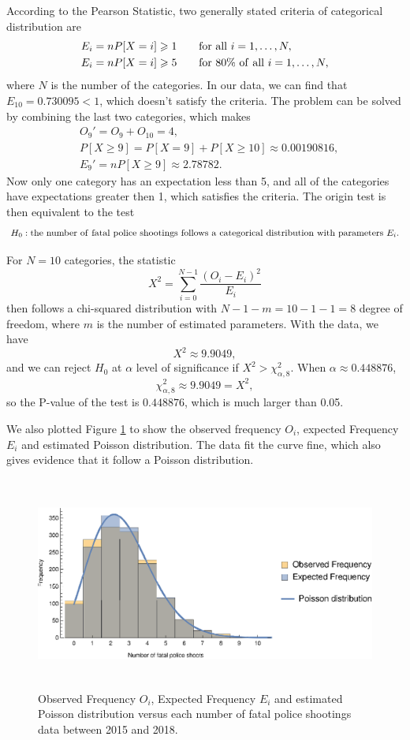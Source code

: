\documentclass[conf]{new-aiaa}
\begin{document}
According to the Pearson Statistic, two generally stated criteria of  categorical distribution are
\begin{align*}
E_i=nP[X=i]\geqslant1 & \qquad {\rm for\ all\ }i=1,\dots,N,\\
E_i=nP[X=i]\geqslant5 & \qquad {\rm for\ 80\%\ of\ all\ }i=1,\dots,N,
\end{align*}
where $N$ is the number of the categories. In our data, we can find that $E_{10}=0.730095<1$, which doesn't satisfy the criteria. The problem can be solved by combining the last two categories, which makes
\begin{align*}
&O_9'=O_9+O_{10}=4,\\
&P[X\geqslant9]=P[X=9]+P[X\geqslant10]\approx 0.00190816,\\
&E_9'=nP[X\geqslant9]\approx2.78782.
\end{align*}
Now only one category has an expectation less than 5, and all of the categories have expectations greater then 1, which satisfies the criteria. The origin test is then equivalent to the test
$$H_0:{\rm the\ number\ of\ fatal\ police\ shootings\ follows\ a\ categorical\ distribution\ with\ parameters\ }E_i.$$

For $N = 10$ categories, the statistic
$$X^2=\sum_{i=0}^{N-1}\frac{(O_i-E_i)^2}{E_i}$$
then follows a chi-squared distribution with $N-1-m=10-1-1=8$
degree of freedom, where $m$ is the number of estimated parameters. With the data, we have
$$X^2\approx9.9049,$$
and we can reject $H_0$ at $\alpha$ level of significance if $X^2>\chi^2_{\alpha,8}$. When $\alpha\approx0.448876$,
$$\chi^2_{\alpha,8}\approx9.9049=X^2,$$
so the P-value of the test is $0.448876$, which is much larger than 0.05. \medskip

We also plotted Figure \ref{fig:q3-all-exp} to show the observed frequency $O_i$, expected Frequency $E_i$ and estimated Poisson distribution. The data fit the curve fine, which also gives evidence that it follow a Poisson distribution. \medskip

\begin{figure}[!htbp]
\centering
\includegraphics[height=7cm]{q3/q3-all-exp.eps}
\caption{Observed Frequency $O_i$, Expected Frequency $E_i$ and estimated Poisson distribution versus each number of fatal police shootings data between 2015 and 2018.}
\label{fig:q3-all-exp}
\end{figure}
\end{document}
